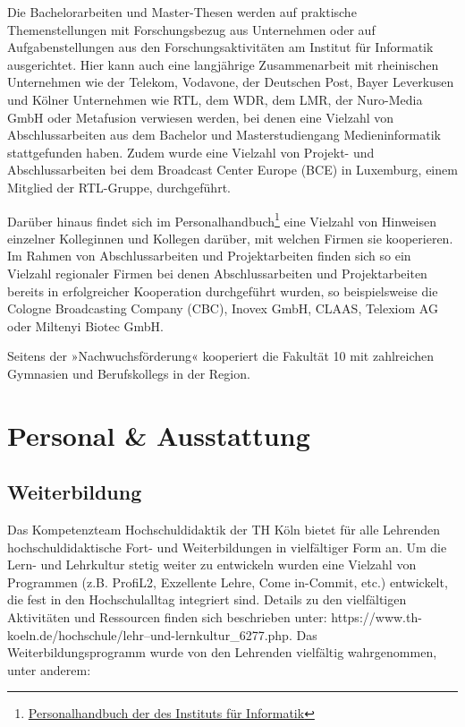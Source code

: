 Die Bachelorarbeiten und Master-Thesen werden auf praktische
Themenstellungen mit Forschungsbezug aus Unternehmen oder auf
Aufgabenstellungen aus den Forschungsaktivitäten am Institut für
Informatik ausgerichtet. Hier kann auch eine langjährige Zusammenarbeit
mit rheinischen Unternehmen wie der Telekom, Vodavone, der Deutschen
Post, Bayer Leverkusen und Kölner Unternehmen wie RTL, dem WDR, dem LMR,
der Nuro-Media GmbH oder Metafusion verwiesen werden, bei denen eine
Vielzahl von Abschlussarbeiten aus dem Bachelor und Masterstudiengang
Medieninformatik stattgefunden haben. Zudem wurde eine Vielzahl von
Projekt- und Abschlussarbeiten bei dem Broadcast Center Europe (BCE) in
Luxemburg, einem Mitglied der RTL-Gruppe, durchgeführt.

Darüber hinaus findet sich im Personalhandbuch\footnote{\href{http://bit.ly/2mpcbWN}{Personalhandbuch
  der des Instituts für Informatik}} eine Vielzahl von Hinweisen
einzelner Kolleginnen und Kollegen darüber, mit welchen Firmen sie
kooperieren. Im Rahmen von Abschlussarbeiten und Projektarbeiten finden
sich so ein Vielzahl regionaler Firmen bei denen Abschlussarbeiten und
Projektarbeiten bereits in erfolgreicher Kooperation durchgeführt
wurden, so beispielsweise die Cologne Broadcasting Company (CBC), Inovex
GmbH, CLAAS, Telexiom AG oder Miltenyi Biotec GmbH.

Seitens der »Nachwuchsförderung« kooperiert die Fakultät 10 mit
zahlreichen Gymnasien und Berufskollegs in der Region.

\chapter{Personal \& Ausstattung}\label{personal-ausstattung}

\section{Weiterbildung}\label{weiterbildung}

Das Kompetenzteam Hochschuldidaktik der TH Köln bietet für alle
Lehrenden hochschuldidaktische Fort- und Weiterbildungen in vielfältiger
Form an. Um die Lern- und Lehrkultur stetig weiter zu entwickeln wurden
eine Vielzahl von Programmen (z.B. ProfiL2, Exzellente Lehre, Come
in-Commit, etc.) entwickelt, die fest in den Hochschulalltag integriert
sind. Details zu den vielfältigen Aktivitäten und Ressourcen finden sich
beschrieben unter:
https://www.th-koeln.de/hochschule/lehr--und-lernkultur\_6277.php. Das
Weiterbildungsprogramm wurde von den Lehrenden vielfältig wahrgenommen,
unter anderem:

